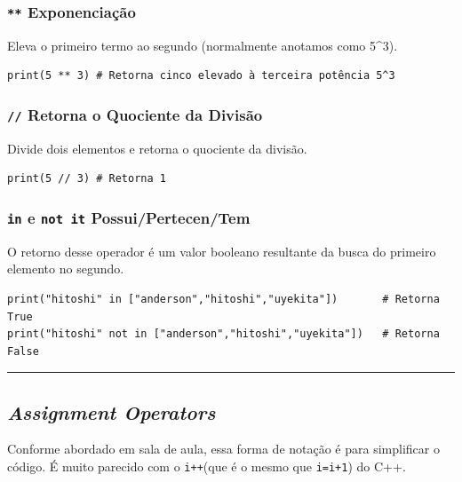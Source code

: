 \documentclass[]{book}
\begin{document}
\subsubsection{\texorpdfstring{\texttt{**}
Exponenciação}{** Exponenciação}}\label{exponenciacao}

Eleva o primeiro termo ao segundo (normalmente anotamos como 5\^{}3).

\begin{verbatim}
print(5 ** 3) # Retorna cinco elevado à terceira potência 5^3
\end{verbatim}

\subsubsection{\texorpdfstring{\texttt{//} Retorna o Quociente da
Divisão}{// Retorna o Quociente da Divisão}}\label{retorna-o-quociente-da-divisao}

Divide dois elementos e retorna o quociente da divisão.

\begin{verbatim}
print(5 // 3) # Retorna 1
\end{verbatim}

\subsubsection{\texorpdfstring{\texttt{in} e \texttt{not\ it}
Possui/Pertecen/Tem}{in e not it Possui/Pertecen/Tem}}\label{in-e-not-it-possuipertecentem}

O retorno desse operador é um valor booleano resultante da busca do
primeiro elemento no segundo.

\begin{verbatim}
print("hitoshi" in ["anderson","hitoshi","uyekita"])       # Retorna True
print("hitoshi" not in ["anderson","hitoshi","uyekita"])   # Retorna False
\end{verbatim}

\begin{center}\rule{0.5\linewidth}{\linethickness}\end{center}

\subsection{\texorpdfstring{\emph{Assignment
Operators}}{Assignment Operators}}\label{assignment-operators}

Conforme abordado em sala de aula, essa forma de notação é para
simplificar o código. É muito parecido com o \texttt{i++}(que é o mesmo
que \texttt{i=i+1}) do C++.
\end{document}
